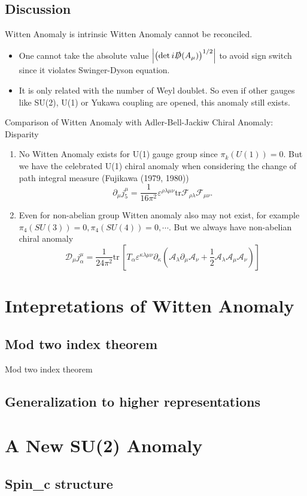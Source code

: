 \documentclass[10pt,aspectratio=43,xcolor=x11names,t]{beamer}%
\begin{document}
	\subsection{Discussion}
		\begin{frame}{Witten Anomaly is intrinsic}
			Witten Anomaly cannot be reconciled.\pause
			\begin{itemize}
				\item One cannot take the absolute value $\left|\left(\mathrm{det}\,i\slashed{D}(A_\mu)\right)^{1/2}\right|$ to avoid sign switch since it violates Swinger-Dyson equation.\pause 
				\item It is only related with the number of Weyl doublet. So even if other gauges like SU(2), U(1) or Yukawa coupling are opened, this anomaly still exists. 
			\end{itemize}
		\end{frame}
		\begin{frame}{Comparison of Witten Anomaly with Adler-Bell-Jackiw Chiral Anomaly: Disparity}
			\begin{enumerate}
				\item No Witten Anomaly exists for U(1) gauge group since $\pi_k(U(1))=0$. But we have the celebrated U(1) chiral anomaly when considering the change of path integral measure (Fujikawa (1979, 1980))
				\begin{equation*}
					\partial_\mu j_5^\mu=\dfrac{1}{16\pi^2}\varepsilon^{\rho\lambda\mu\nu}\mathrm{tr}\mathcal{F}_{\rho\lambda}\mathcal{F}_{\mu\nu}.
				\end{equation*}\pause
				\item Even for non-abelian group Witten anomaly also may not exist, for example $\pi_4(SU(3))=0,\pi_4(SU(4))=0,\cdots$. But we always have non-abelian chiral anomaly
				\begin{equation*}
					\mathcal{D}_\mu j^\mu_\alpha=\dfrac{1}{24\pi^2}\mathrm{tr}\,\left[T_\alpha \varepsilon^{\kappa\lambda\mu\nu}\partial_\kappa\left(\mathcal{A}_\lambda \partial_\mu\mathcal{A}_\nu+\dfrac{1}{2}\mathcal{A}_\lambda\mathcal{A}_\mu\mathcal{A}_\nu\right) \right] 
				\end{equation*}
			\end{enumerate}
		\end{frame}

\section{Intepretations of Witten Anomaly}
	\subsection{Mod two index theorem}
		\begin{block}{Mod two index theorem}
			
		\end{block}

	\subsection{Generalization to higher representations}
		

\section{A New SU(2) Anomaly}
	\subsection{Spin_c structure}

\fi
\end{document}
